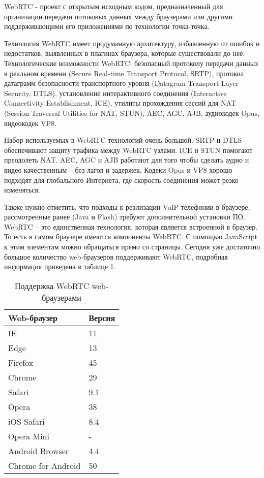 WebRTC - проект с открытым исходным кодом, предназначенный для организации передачи потоковых данных между браузерами или другими поддерживающими его приложениями по технологии точка-точка.\cite{WebRTC}

Технология WebRTC имеет продуманную архитектуру, избавленную от ошибок и недостатков, выявленных в плагинах браузера, которые существовали до неё. Технологические возможности WebRTC: безопасный протоколу передачи данных в реальном времени (Secure Real-time Transport Protocol, SRTP), протокол датаграмм безопасности транспортного уровня (Datagram Transport Layer Security, DTLS), установление интерактивного соединения (Interactive Connectivity Establishment, ICE), утилиты прохождения сессий для NAT (Session Traversal Utilities for NAT, STUN), AEC, AGC, AJB, аудиокодек Opus, видеокодек VP8.

Набор используемых в WebRTC технологий очень большой. SRTP и DTLS обеспечивают защиту трафика между WebRTC узлами. ICE и STUN помогают преодолеть NAT.\cite{sip_nat} AEC, AGC и AJB работают для того чтобы сделать аудио и видео качественным – без лагов и задержек. Кодеки Opus и VP8 хорошо подходят для глобального Интернета, где скорость соединения может резко изменяться.

Также нужно отметить, что подходы к реализации VoIP-телефонии в браузере, рассмотренные ранее (Java и Flash) требуют дополнительной установки ПО. WebRTC – это единственная технология, которая является встроенной в браузер. То есть в самом браузере имеются компоненты WebRTC. С помощью JavaScript к этим элементам можно обращаться прямо со страницы. Сегодня уже достаточно большое количество web-браузеров поддерживают WebRTC, подробная информация приведена в таблице \ref{table:browsers}.\cite{browsers_url}

\begin{table}
    \caption{Поддержка WebRTC web-браузерами}
    \begin{center}
    \begin{tabular}{|l|l|}
    \hline
    \textbf{Web-браузер} & \textbf{Версия}\\
    \hline
    IE & 11 \\
    \hline
    Edge & 13 \\
    \hline
    Firefox & 45 \\
    \hline
    Chrome & 29 \\
    \hline
    Safari & 9.1 \\
    \hline
    Opera & 38 \\
    \hline
    iOS Safari & 8.4 \\
    \hline
    Opera Mini & - \\
    \hline
    Android Browser & 4.4 \\
    \hline
    Chrome for Android & 50 \\
    \hline
    \end{tabular}
    \end{center}
    \label{table:browsers}
\end{table}

